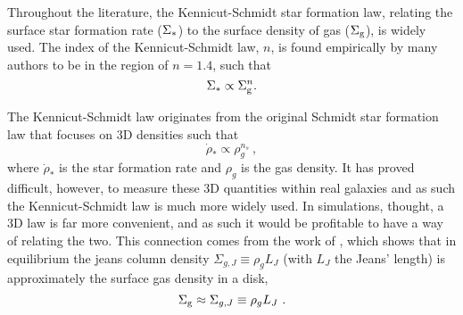 Throughout the literature, the Kennicut-Schmidt star formation law, relating the surface star formation rate ($\Sigma_*$) to the surface density of gas ($\Sigma_\mathrm{g}$), is widely used.
The index of the Kennicut-Schmidt law, $n$, is found empirically by many authors to be in the region of $n=1.4$, such that
\begin{equation}
\label{eqn:ks}
\Sigma_* \propto \Sigma_\mathrm{g}^n.
\end{equation}

The Kennicut-Schmidt law originates from the original Schmidt star formation law that focuses on 3D densities such that
\begin{equation}
\label{eqn:s}
\dot{\rho}_* \propto \rho_g^{n_s}~,
\end{equation}
where $\dot{\rho}_*$ is the star formation rate and $\rho_g$ is the gas density.
It has proved difficult, however, to measure these 3D quantities within real galaxies and as such the Kennicut-Schmidt law is much more widely used.
In simulations, thought, a 3D law is far more convenient, and as such it would be profitable to have a way of relating the two. 
This connection comes from the work of \citet{schaye2004}, which shows that in equilibrium the jeans column density $\Sigma_{g, J} \equiv \rho_g L_J$ (with $L_J$ the Jeans' length) is approximately the surface gas density in a disk,
\begin{equation}
\label{eqn:s04}
\Sigma_\mathrm{g} \approx \Sigma_{g, J} \equiv \rho_g L_J~.
\end{equation}
